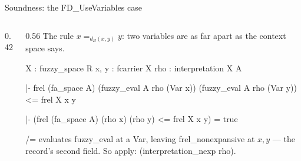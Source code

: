\documentclass[10pt,aspectratio=169]{beamer}
\newcommand{\qeq}[1]{=_{#1}}
\newcommand{\rid}[1]{{\ttfamily\small #1}}
\begin{document}
                \begin{frame}[fragile]{Soundness: the \rid{FD\_UseVariables} case}
                    \begin{columns}[T]
                        \begin{column}{0.42\textwidth}
                        \end{column}
                        \begin{column}{0.56\textwidth}
                            {\footnotesize The rule $x \qeq{d_B(x,y)} y$: two
                                variables are as far apart as the context
                            space says.}
                            \begin{goalbox}[title={Goal 6 / 12 \quad
                                (FD\_UseVariables)}]
                                \begin{gctx}
X : fuzzy_space R
x, y : fcarrier X
rho : interpretation X A
                                \end{gctx}
                                \tcblower
                                \begin{gconc}
|- frel (fa_space A) (fuzzy_eval A rho (Var x))
                     (fuzzy_eval A rho (Var y))
   <= frel X x y
                                \end{gconc}
                            \end{goalbox}
                            \begin{goalbox}[title={after \texttt{move => //=}}]
                                \begin{gconc}
|- (frel (fa_space A) (rho x) (rho y) <= frel X x y) = true
                                \end{gconc}
                            \end{goalbox}
                            {\footnotesize \rid{/=} evaluates \rid{fuzzy\_eval}
                                at a \rid{Var}, leaving
                                \rid{frel\_nonexpansive} at $x,y$ --- the
                                record's second field. So
                            \rid{apply: (interpretation\_nexp rho)}.}
                        \end{column}
                    \end{columns}
                \end{frame}
\end{document}
